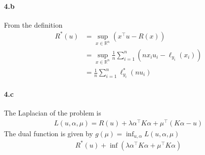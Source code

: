 \documentclass[10pt]{article}
\begin{document}
    \paragraph{4.b} From the definition
    \begin{align*}
        R^*(u) &= \sup_{x \in \mathbb{R}^n}\left( x^\top u - R(x) \right) \\
        &= \sup_{x \in \mathbb{R}^n} \frac{1}{n}\sum_{i=1}^n (nx_i u_i - 
        \ell_{y_i}(x_i))\\
        &= \frac{1}{n}\sum_{i=1}^n \ell^*_{y_i}(nu_i)
    \end{align*}
        
    \paragraph{4.c} The Laplacian of the problem is 
    \begin{align*}
        L(u, \alpha, \mu) = R(u) + \lambda \alpha^\top K \alpha + \mu^\top (
        K\alpha - u)
    \end{align*}
    The dual function is given by $g(\mu) = \inf_{u, \alpha} L(u, \alpha, \mu)$
    \begin{align*}
        R^*(u) + \inf(\lambda\alpha^\top K \alpha + \mu^\top K\alpha)
    \end{align*}
\end{document}
